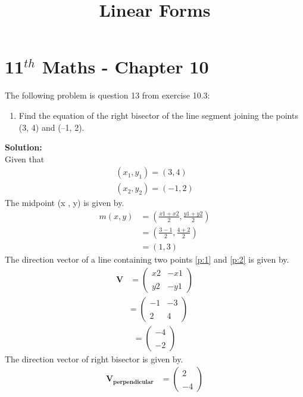 \documentclass[12pt]{article}
\newcommand{\solution}{\noindent \textbf{Solution: }}
\newcommand{\myvec}[1]{\ensuremath{\begin{pmatrix}#1\end{pmatrix}}}
\let\vec\mathbf
\begin{document}
\graphicspath{{./Documents}{./figs}}
\begin{center}
  \title{\textbf{Linear Forms}}
  \date{\vspace{-5ex}}
  \maketitle
\end{center}
\setcounter{page}{1}
\section*{11$ ^{th} $ Maths - Chapter 10}
The following problem is question 13 from exercise 10.3:
\begin{enumerate}
  \item Find the equation of the right bisector of the
 line segment joining the points (3, 4) and (–1, 2).
\end{enumerate}
\solution \\
Given that \\
\begin{align}
(x_1 , y_1) = (3 , 4)
\label{p:1} \\
(x_2 , y_2) = (-1 , 2) 
\label{p:2}
\end{align}
The midpoint (x , y) is given by. 
\begin{align}
	m (x , y) &= \left( \frac{x1 + x2}{2} , \frac{y1 + y2}{2}\right)\\
	      &= \left( \frac{3 - 1}{2} , \frac{4 + 2}{2} \right )\\
	      &=( 1 , 3 ) \label{p:5}
\end{align}
The direction vector of a line containing two points \eqref{p:1} and
\eqref{p:2} is given by.
\begin{align}
	\vec{V} &=
	    \myvec{x2 & -x1 \\ \\ y2 & -y1} 
    \end{align}
    \begin{align}
	    &=
		 \myvec{ -1 & -3 \\ \\ 2 & 4}
    \end{align}
    \begin{align}
        =
		   \myvec{-4 \\ \\ -2}
    \end{align}
    The direction vector of right bisector is given by.
    \begin{align}
	    \vec{V_{perpendicular}} &=
		  \myvec{2 \\ \\ -4}
    \end{align}
\end{document}
